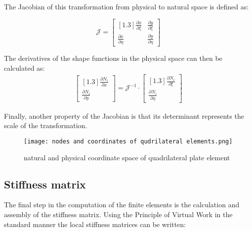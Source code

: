 The Jacobian of this transformation from physical to natural space is
defined as:

\begin{equation}
\mathcal{J} = 
\begin{bmatrix}[1.3]
\frac{\partial x}{\partial\xi} & \frac{\partial y}{\partial\xi} \\
\frac{\partial x}{\partial\eta} & \frac{\partial y}{\partial\eta}
\end{bmatrix}
\end{equation}


The derivatives of the shape functions in the physical space can then be
calculated as:
\begin{equation}
\begin{aligned}
\begin{bmatrix}[1.3]
\frac{\partial N_{i}}{\partial x} \\
\frac{\partial N_{i}}{\partial y}
\end{bmatrix} = \mathcal{J}^{- 1} \cdot \begin{bmatrix}[1.3]
\frac{\partial N_{i}}{\partial\xi} \\
\frac{\partial N_{i}}{\partial\eta}
\end{bmatrix}
\end{aligned}
\end{equation}

Finally, another property of the Jacobian is that its determinant
represents the scale of the transformation.
\begin{figure}
\centering
  
\texttt{[image: nodes and coordinates of qudrilateral elements.png]}
\caption{natural and physical coordinate space of quadrilateral plate element \cite{bolla2022}}
\end{figure}


\subsection{Stiffness matrix }\label{stiffness-matrix}

The final step in the computation of the finite elements is the
calculation and assembly of the stiffness matrix. Using the Principle of
Virtual Work in the standard manner the local stiffness matrices can be
written:

